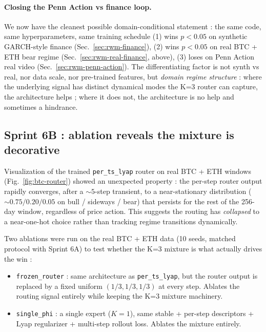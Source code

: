 \documentclass[11pt,a4paper]{article}
\begin{document}
\paragraph{Closing the Penn Action vs finance loop.}
We now have the cleanest possible domain-conditional statement : the
same code, same hyperparameters, same training schedule (1) wins
$p{<}0.05$ on synthetic GARCH-style finance (Sec.~\ref{sec:rwm-finance}),
(2) wins $p{<}0.05$ on real BTC + ETH bear regime
(Sec.~\ref{sec:rwm-real-finance}, above), (3) loses on Penn Action
real video (Sec.~\ref{sec:rwm-penn-action}). The differentiating
factor is not synth vs real, nor data scale, nor pre-trained features,
but \emph{domain regime structure} : where the underlying signal has
distinct dynamical modes the K=3 router can capture, the architecture
helps ; where it does not, the architecture is no help and sometimes
a hindrance.

\subsection{Sprint 6B : ablation reveals the mixture is decorative}
\label{sec:rwm-sprint6b}

Visualization of the trained \texttt{per\_ts\_lyap} router on real
BTC + ETH windows (Fig.~\ref{fig:btc-router}) showed an unexpected
property : the per-step router output rapidly converges, after a
$\sim 5$-step transient, to a near-stationary distribution
($\sim 0.75 / 0.20 / 0.05$ on bull / sideways / bear) that persists
for the rest of the 256-day window, regardless of price action. This
suggests the routing has \emph{collapsed} to a near-one-hot choice
rather than tracking regime transitions dynamically.

Two ablations were run on the real BTC + ETH data (10 seeds, matched
protocol with Sprint 6A) to test whether the K=3 mixture is what
actually drives the win :

\begin{itemize}[leftmargin=*]
\item \texttt{frozen\_router} : same architecture as
  \texttt{per\_ts\_lyap}, but the router output is replaced by a
  fixed uniform $(1/3, 1/3, 1/3)$ at every step. Ablates the routing
  signal entirely while keeping the K=3 mixture machinery.
\item \texttt{single\_phi} : a single expert ($K{=}1$), same stable
  + per-step descriptors + Lyap regularizer + multi-step rollout
  loss. Ablates the mixture entirely.
\end{itemize}
\end{document}
